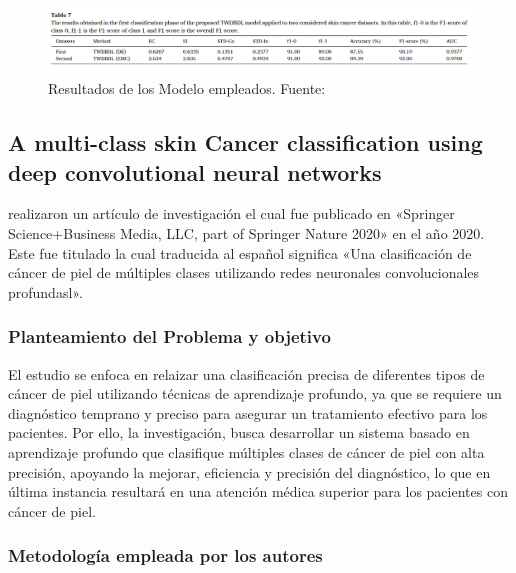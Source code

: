 \begin{figure}[h]
	\begin{center}
		\includegraphics[width=1\textwidth]{2/figuras/Uncertainty_quantification_skin _imagen_01.png}
		\caption{Resultados de los Modelo empleados. Fuente: \cite{abdar2021uncertainty}}
		\label{1:fig}
	\end{center}
\end{figure}


\subsection{A multi-class skin Cancer classification using deep convolutional neural networks \citep*{chaturvedi2020multi}}
\citeauthor{chaturvedi2020multi} realizaron un artículo de investigación el cual fue publicado en «Springer Science+Business Media, LLC, part of Springer Nature 2020» en el año 2020. Este fue titulado  la cual traducida al español significa «Una clasificación de cáncer de piel de múltiples clases utilizando redes neuronales convolucionales profundasl».

\subsubsection{Planteamiento del Problema y objetivo}


El estudio se enfoca en relaizar una clasificación precisa de diferentes tipos de cáncer de piel utilizando técnicas de aprendizaje profundo, ya que se requiere un diagnóstico temprano y preciso para asegurar un tratamiento efectivo para los pacientes. 
Por ello, la investigación, busca desarrollar un sistema basado en aprendizaje profundo que clasifique múltiples clases de cáncer de piel con alta precisión, apoyando la mejorar, eficiencia y precisión del diagnóstico, lo que en última instancia resultará en una atención médica superior para los pacientes con cáncer de piel. 
 






\subsubsection{Metodología empleada por los autores}
\newcommand{\TUAMCone}{Recopilación de la data: Se uso los siguetes conjustos de datos: ISIC2017, ISIC2018, y HAM10000. Donde se realizó ajustes para asegurar que los datos estén en un formato adecuado para el entrenamiento de los modelos.
}

